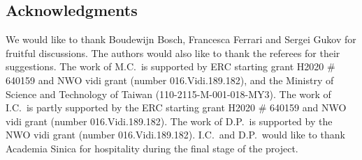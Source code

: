 \documentclass[pdftex]{sigma}
\theoremstyle{definition}
\numberwithin{equation}{section}
\begin{document}
\subsection*{Acknowledgments} We would like to thank Boudewijn Bosch,
Francesca Ferrari and Sergei Gukov for fruitful discussions.
The authors would also like to thank the referees for their suggestions.
The work of M.C.\ is supported by ERC starting grant H2020 \# 640159 and
NWO vidi grant (number 016.Vidi.189.182), and the Ministry of Science and Technology of
Taiwan (110-2115-M-001-018-MY3). The work of I.C.\ is partly supported by the
ERC starting grant H2020 \# 640159 and
NWO vidi grant (number 016.Vidi.189.182). The work of D.P.\ is supported by the NWO vidi grant (number 016.Vidi.189.182). I.C.\ and D.P.\ would like to thank Academia Sinica for hospitality during the final stage of the project.
\end{document}
